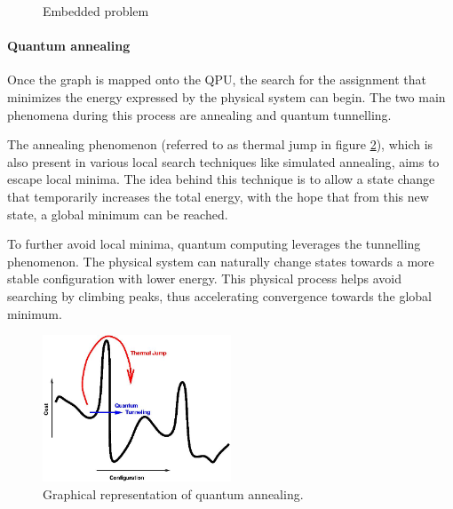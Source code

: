 \begin{figure}[H]
  \begin{center}
      \caption{Embedded problem}
      \label{embedding}
  \end{center}
\end{figure}

\paragraph{Quantum annealing} 

Once the graph is mapped onto the QPU, the search for the assignment that minimizes the energy expressed by the physical system can begin. The two main phenomena during this process are annealing and quantum tunnelling.

The annealing phenomenon (referred to as thermal jump in figure \ref{q-anneal}), which is also present in various local search techniques like simulated annealing\cite{SimulatedAnnealing}, aims to escape local minima. The idea behind this technique is to allow a state change that temporarily increases the total energy, with the hope that from this new state, a global minimum can be reached.

To further avoid local minima, quantum computing leverages the tunnelling phenomenon. The physical system can naturally change states towards a more stable configuration with lower energy. This physical process helps avoid searching by climbing peaks, thus accelerating convergence towards the global minimum.

\begin{figure}[H]
  \centering
  \includegraphics[width=0.5\textwidth]{figures/q-annealing.jpg}
  \caption{Graphical representation of quantum annealing.}
  \label{q-anneal}
\end{figure}